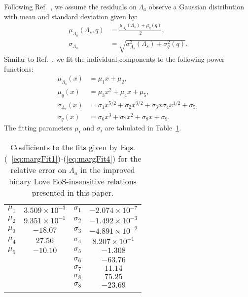 \documentclass[prd,twocolumn,nofootinbib,superscriptaddress,amsmath,amssymb]{revtex4-1}
\begin{document}
Following Ref.~\cite{Katerina:residuals}, we assume the residuals on $\Lambda_a$ observe a Gaussian distribution with mean and standard deviation given by:
\begin{align}
\mu_{\Lambda_a}(\Lambda_s,q) &=\frac{\mu_{\Lambda_s}(\Lambda_s)+\mu_{q}(q)}{2},\\ 
\sigma_{\Lambda_a} &=\sqrt{\sigma_{\Lambda_s}^2(\Lambda_s) + \sigma_{q}^2(q)}. 
\end{align}
Similar to Ref.~\cite{Katerina:residuals}, we fit the individual components to the following power functions:
\begin{align}
\mu_{\Lambda_s}(x) &= \mu_1 x + \mu_2, \label{eq:margFit1}\\ 
\mu_{q}(x) &= \mu_3 x^2 + \mu_4 x + \mu_5, \label{eq:margFit2}\\ 
\sigma_{\Lambda_s}(x) &= \sigma_1 x^{5/2} + \sigma_2 x^{3/2} + \sigma_3 x \sigma_4 x^{1/2} + \sigma_5, \label{eq:margFit3}\\ 
\sigma_{q}(x) &= \sigma_6 x^3 + \sigma_7 x^2 + \sigma_8 x + \sigma_9. \label{eq:margFit4}
\end{align}
The fitting parameters $\mu_i$ and $\sigma_i$ are tabulated in Table~\ref{tab:marginalized}.

\begin{table}
\centering
\caption{
Coefficients to the fits given by Eqs.(~\ref{eq:margFit1})-(\ref{eq:margFit4}) for the relative error on $\Lambda_a$ in the improved binary Love EoS-insensitive relations presented in this paper.
}\label{tab:marginalized}
\addtolength{\tabcolsep}{1pt} 
\begin{tabular}{ c | c || c | c}
\hline 
\noalign{\smallskip}
$\mu_1$ & $3.509 \times 10^{-3}$ & $\sigma_1$ & $-2.074 \times 10^{-7}$\\
$\mu_2$ & $9.351 \times 10^{-1}$ & $\sigma_2$ & $-1.492 \times 10^{-3}$\\
$\mu_3$ & $-18.07$ & $\sigma_3$ & $-4.891 \times 10^{-2}$\\
$\mu_4$ & $27.56$ & $\sigma_4$ & $8.207 \times 10^{-1}$\\
$\mu_5$ & $-10.10$ & $\sigma_5$ & $-1.308$\\
 &  & $\sigma_6$ & $-63.76$\\
 &  & $\sigma_7$ & $11.14$\\
 &  & $\sigma_8$ & $75.25$\\
 &  & $\sigma_8$ & $-23.69$\\
 \noalign{\smallskip}
 \hline
\end{tabular}
\addtolength{\tabcolsep}{-1pt}
\end{table}
\end{document}
